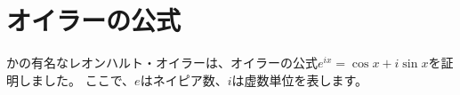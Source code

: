 \documentclass{ltjsarticle}
\begin{document}
\section{オイラーの公式}
かの有名なレオンハルト・オイラーは、オイラーの公式$e^{ix} = \cos{x} + i\sin{x}$を証明しました。
ここで、$e$はネイピア数、$i$は虚数単位を表します。
\end{document}
